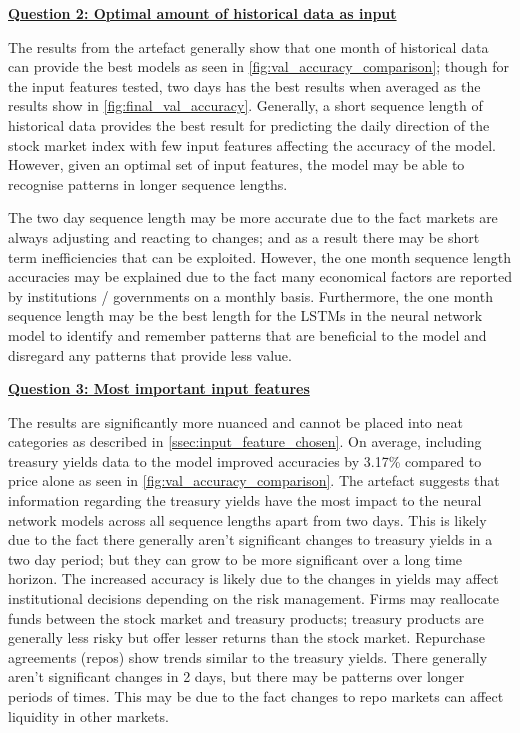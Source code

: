\hyperref[optimal_historical_question]{\textbf{Question 2: Optimal amount of historical data as input}}

The results from the artefact generally show that one month of historical data can provide the best models as seen in \autoref{fig:val_accuracy_comparison};
though for the input features tested, two days has the best results when averaged as the results show in \autoref{fig:final_val_accuracy}.
Generally, a short sequence length of historical data provides
the best result for predicting the daily direction of the stock market index with few input features affecting the accuracy of the
model. However, given an optimal set of input features, the model may be able to recognise patterns in longer sequence lengths.

The two day sequence length may be more accurate due to the fact markets are always adjusting and reacting to changes; and as a result
there may be short term inefficiencies that can be exploited. However, the one month sequence length accuracies may be explained due to
the fact many economical factors are reported by institutions / governments on a monthly basis. Furthermore, the one month sequence length
may be the best length for the LSTMs in the neural network model to identify and remember patterns that are beneficial to the model and
disregard any patterns that provide less value.

\hyperref[most_important_features_question]{\textbf{Question 3: Most important input features}}

The results are significantly more nuanced and cannot be placed into neat categories as described in \autoref{ssec:input_feature_chosen}.
On average, including treasury yields data to the model improved accuracies by 3.17\% compared to price alone as seen in
\autoref{fig:val_accuracy_comparison}.
The artefact suggests that information regarding the treasury yields have the most impact to the neural network models across all sequence
lengths apart from two days. 
This is likely due to the fact there generally aren't significant changes to treasury yields in a two day period; but they can
grow to be more significant over a long time horizon. The increased accuracy is likely due to the changes in yields may affect institutional decisions
depending on the risk management. Firms may reallocate funds between the stock market and treasury products; treasury products are generally less risky but
offer lesser returns than the stock market. Repurchase agreements (repos) show trends similar to the treasury yields. There generally aren't significant
changes in 2 days, but there may be patterns over longer periods of times. This may be due to the fact changes to repo markets
can affect liquidity in other markets.

